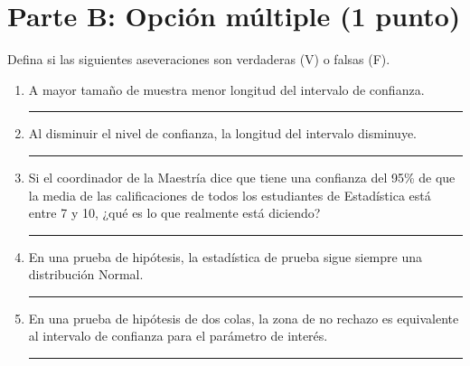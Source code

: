 \documentclass[12pt]{article}
\begin{document}
\section*{Parte B: Opción múltiple (1 punto)}

Defina si las siguientes aseveraciones son verdaderas (V) o falsas (F).

\begin{enumerate}
    \item A mayor tamaño de muestra menor longitud del intervalo de confianza. \hfill \rule{5cm}{0.15mm}
    \item Al disminuir el nivel de confianza, la longitud del intervalo disminuye. \hfill \rule{5cm}{0.15mm}
    \item Si el coordinador de la Maestría dice que tiene una confianza del 95\% de que la media de las calificaciones de todos los estudiantes de Estadística está entre 7 y 10, ¿qué es lo que realmente está diciendo?
    
    \vspace{0.5cm}
    \rule{14cm}{0.15mm}

    \item En una prueba de hipótesis, la estadística de prueba sigue siempre una distribución Normal. \hfill \rule{5cm}{0.15mm}
    \item En una prueba de hipótesis de dos colas, la zona de no rechazo es equivalente al intervalo de confianza para el parámetro de interés. \hfill \rule{5cm}{0.15mm}
\end{enumerate}
\end{document}
